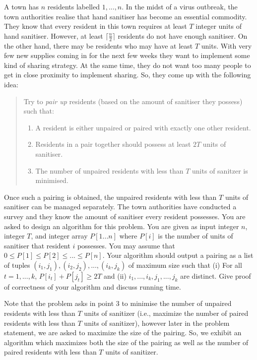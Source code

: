 \documentclass[answers]{exam}
\begin{document}
\begin{questions}
\vspace{0.4in}


\question[25] A town has $n$ residents labelled $1, ..., n$. In the midst of a virus outbreak, the town authorities realise that hand sanitiser has become an essential commodity. 
They know that every resident in this town requires at least $T$ integer units of hand sanitiser. 
However, at least $\lceil \frac{n}{2}\rceil$ residents do not have enough sanitiser. 
On the other hand, there may be residents who may have at least $T$ units. 
With very few new supplies coming in for the next few weeks they want to implement some kind of sharing strategy. 
At the same time, they do not want too many people to get in close proximity to implement sharing. So, they come up with the following idea:
\begin{quote}
Try to {\em pair up} residents (based on the amount of sanitiser they possess) such that: 
\begin{enumerate}
\item A resident is either unpaired or paired with exactly one other resident. 
\item Residents in a pair together should possess at least $2T$ units of sanitiser.
\item The number of unpaired residents with less than $T$ units of sanitzer is minimised.
\end{enumerate}
\end{quote}

Once such a pairing is obtained, the unpaired residents with less than $T$ units of sanitiser can be  managed separately. The town authorities have conducted a survey and they know the amount of sanitiser every  resident possesses. You are asked to design an algorithm for this problem. You are given as input integer $n$,  integer $T$, and integer array $P[1...n]$ where $P[i]$ is the number of units of sanitiser that resident $i$ possesses. You may assume that $0 \leq P[1] \leq P[2] \leq ... \leq P[n]$. 
Your algorithm should output a pairing as a list of tuples $(i_1, j_1), (i_2, j_2), ..., (i_k, j_k)$ of maximum size such that (i) For all $t = 1, ..., k$, $P[i_t] + P[j_t] \geq 2T$ and (ii) $i_1, ..., i_k, j_1, ..., j_k$ are distinct.
Give proof of correctness of your algorithm and discuss running time.

\begin{solution}

\setcounter{lemma}{0}
\setcounter{claim}{0}


Note that the problem asks in point 3 to minimise the number of unpaired residents with less than $T$ units of sanitizer (i.e., maximize the number of paired residents with less than $T$ units of sanitizer), however later in the problem statement, we are asked to maximize the size of the pairing. So, we exhibit an algorithm which maximizes both the size of the pairing as well as the number of paired residents with less than $T$ units of sanitizer.


\end{solution}
\end{questions}
\end{document}

